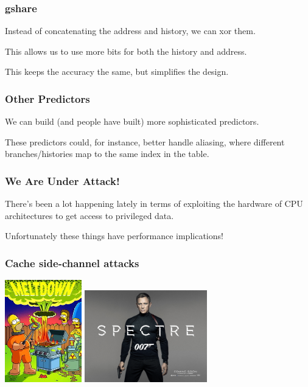 \begin{frame}
\frametitle{gshare}

Instead of concatenating the address and history, we can xor them. 

This allows
us to use more bits for both the history and address. 

This keeps the accuracy the same,
but simplifies the design.


\end{frame}



\begin{frame}
\frametitle{Other Predictors}

 We can build (and people have built) more sophisticated predictors.


These predictors could, for instance, better handle aliasing, where
different branches/histories map to the same index in the table.

\end{frame}

\begin{frame}
\frametitle{We Are Under Attack!}

There's been a lot happening lately in terms of exploiting the hardware of CPU architectures to get access to privileged data. 

Unfortunately these things have performance implications!

\end{frame}


\begin{frame}
\frametitle{Cache side-channel attacks}

\begin{center}
\includegraphics[width=0.25\textwidth]{images/meltdown.jpg}
\includegraphics[width=0.40\textwidth]{images/spectre.jpg}
\end{center}

\end{frame}




